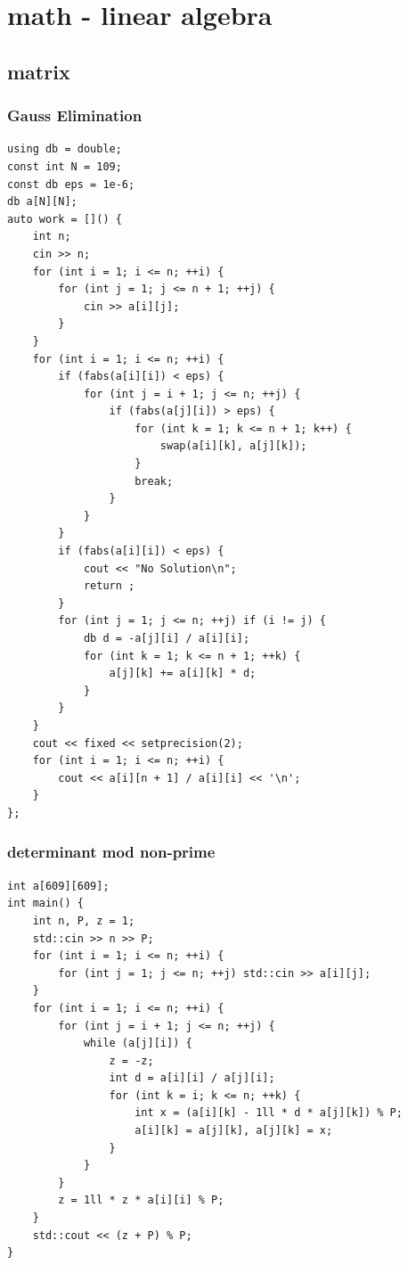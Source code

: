 \documentclass[UTF8, a4paper, titlepage, twoside]{ctexart}
\begin{document}
\newpage
\section{ math - linear algebra}
\subsection{ matrix }
\subsubsection*{ Gauss Elimination }

\begin{lstlisting}[style=cpp]
using db = double;
const int N = 109;
const db eps = 1e-6;
db a[N][N];
auto work = []() {
    int n;
    cin >> n;
    for (int i = 1; i <= n; ++i) {
        for (int j = 1; j <= n + 1; ++j) {
            cin >> a[i][j];
        }
    }
    for (int i = 1; i <= n; ++i) {
        if (fabs(a[i][i]) < eps) {
            for (int j = i + 1; j <= n; ++j) {
                if (fabs(a[j][i]) > eps) {
                    for (int k = 1; k <= n + 1; k++) {
                        swap(a[i][k], a[j][k]);
                    }
                    break;
                }
            }
        }
        if (fabs(a[i][i]) < eps) {
            cout << "No Solution\n";
            return ;
        }
        for (int j = 1; j <= n; ++j) if (i != j) {
            db d = -a[j][i] / a[i][i];
            for (int k = 1; k <= n + 1; ++k) {
                a[j][k] += a[i][k] * d;
            }
        }
    }
    cout << fixed << setprecision(2);
    for (int i = 1; i <= n; ++i) {
        cout << a[i][n + 1] / a[i][i] << '\n';
    }
};
\end{lstlisting}

\subsubsection*{ determinant mod non-prime }
\begin{lstlisting}[style=cpp]
int a[609][609];
int main() {
    int n, P, z = 1;
    std::cin >> n >> P;
    for (int i = 1; i <= n; ++i) {
        for (int j = 1; j <= n; ++j) std::cin >> a[i][j];
    }
    for (int i = 1; i <= n; ++i) {
        for (int j = i + 1; j <= n; ++j) {
            while (a[j][i]) {
                z = -z;
                int d = a[i][i] / a[j][i];
                for (int k = i; k <= n; ++k) {
                    int x = (a[i][k] - 1ll * d * a[j][k]) % P;
                    a[i][k] = a[j][k], a[j][k] = x;
                }
            }
        }
        z = 1ll * z * a[i][i] % P;
    }
    std::cout << (z + P) % P;
}
\end{lstlisting}
\end{document}
